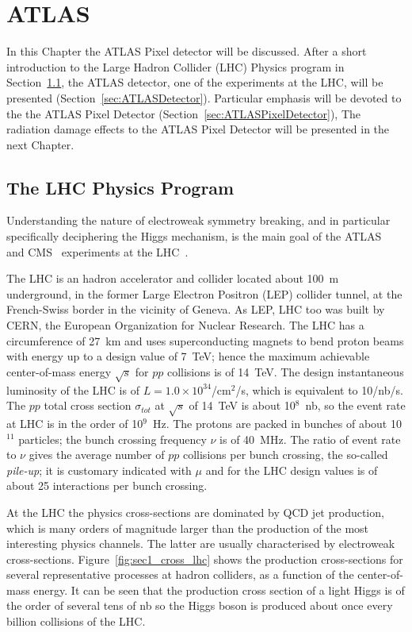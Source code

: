 \chapter{ATLAS}
\label{chap:ATLAS}

In this Chapter the ATLAS Pixel detector will be discussed.
After a short introduction to the Large Hadron Collider (LHC) Physics program in 
Section~\ref{sec:LHCPhysics}, the ATLAS detector, one of the experiments at the LHC, will be 
presented (Section~\ref{sec:ATLASDetector}). Particular emphasis will be devoted to the 
the ATLAS Pixel Detector (Section~\ref{sec:ATLASPixelDetector}),
The radiation damage effects to the ATLAS Pixel Detector will be presented 
in the next  Chapter.

\section{The LHC Physics Program}
\label{sec:LHCPhysics}
Understanding the nature of electroweak symmetry breaking, and in particular  specifically 
deciphering the Higgs mechanism, is the main goal of the ATLAS~\cite{AtlasDetector} and 
CMS~\cite{CMSDetector} experiments at the LHC~\cite{LHCMachine}. 

The LHC is an hadron accelerator and collider located about 100~m underground, in the former 
Large Electron Positron (LEP) collider tunnel, at the French-Swiss border in the vicinity of Geneva. As LEP, LHC too was built by CERN, the European 
Organization for Nuclear Research. The LHC has a circumference of 27~km and uses 
superconducting magnets to bend proton beams with energy up to a design value of 7~TeV; hence 
the maximum achievable center-of-mass energy $\sqrt{s}$ for $pp$ collisions is of 14~TeV. The design instantaneous 
luminosity of the LHC is of $L=1.0\times10^{34}$/cm$^{2}$/s, which is equivalent to 10/nb/s. 
The $pp$ total cross section $\sigma_{tot}$ at $\sqrt{s}$ of 14~TeV is about 10$^8$~nb, 
so the event rate at LHC is in the order of 10$^9$~Hz. 
The protons are packed in bunches of about 10$^{11}$ particles; the bunch crossing frequency $\nu$ is 
of 40~MHz.  The ratio of event rate to $\nu$ gives the average number of $pp$ collisions per 
bunch crossing, the so-called {\it pile-up}; it is customary indicated with $\mu$ and for the LHC 
design values is of about 25 interactions per bunch crossing.

At the LHC the physics cross-sections are dominated by QCD 
jet production, which
is many orders of magnitude larger than the production of the
most interesting physics
channels. The latter are usually characterised by electroweak cross-sections. Figure~\ref{fig:sec1_cross_lhc} shows the production cross-sections for several
representative processes at hadron colliders, as a function of the center-of-mass energy.
It can be seen that the  production cross section of a light Higgs is of the order of several tens of nb so 
the Higgs boson is produced about once every billion collisions of the LHC.

